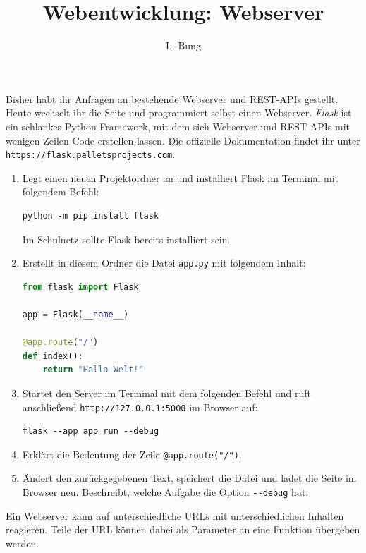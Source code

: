 \documentclass[11pt, a4paper, oneside]{article}
\begin{document}
	\author{L. Bung}
	\title{Webentwicklung: Webserver}
	\subject{SAE}
	\maketitle
	
	
	
	Bisher habt ihr Anfragen an bestehende Webserver und REST-APIs gestellt.
	Heute wechselt ihr die Seite und programmiert selbst einen Webserver.
	\emph{Flask} ist ein schlankes Python-Framework, mit dem sich Webserver und REST-APIs mit wenigen Zeilen Code erstellen lassen.
	Die offizielle Dokumentation findet ihr unter \texttt{https://flask.palletsprojects.com}.
	
	\begin{enumerate}[label=\alph*)]
		\item Legt einen neuen Projektordner an und installiert Flask im Terminal mit folgendem Befehl:
\begin{verbatim}
python -m pip install flask
\end{verbatim}
    Im Schulnetz sollte Flask bereits installiert sein.
		\item Erstellt in diesem Ordner die Datei \texttt{app.py} mit folgendem Inhalt:
\begin{lstlisting}[language=python]
from flask import Flask

app = Flask(__name__)

@app.route("/")
def index():
    return "Hallo Welt!"
\end{lstlisting}
		\item Startet den Server im Terminal mit dem folgenden Befehl und ruft anschließend \linebreak \texttt{http://127.0.0.1:5000} im Browser auf:
\begin{verbatim}
flask --app app run --debug
\end{verbatim}
		\item Erklärt die Bedeutung der Zeile \texttt{@app.route("/")}.
		\item Ändert den zurückgegebenen Text, speichert die Datei und ladet die Seite im Browser neu.
		Beschreibt, welche Aufgabe die Option \lstinline{--debug} hat.
	\end{enumerate}

    \lines[6cm]
	
	
	
	Ein Webserver kann auf unterschiedliche URLs mit unterschiedlichen Inhalten reagieren.
	Teile der URL können dabei als Parameter an eine Funktion übergeben werden.
	
\end{document}
